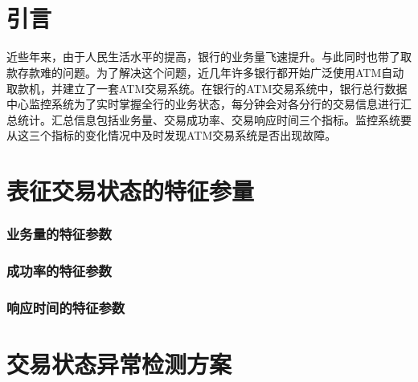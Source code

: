 \documentclass[a4paper]{article}
\begin{document}
\begin{titlepage}



\end{titlepage}

\begin{Huge}
\end{Huge}
\begin{large}
	\begin{flushright}
		
	\end{flushright}
\end{large}
\ \ \\\\

\begin{abstract}
\textit{}
\end{abstract}

\newpage

\tableofcontents

\newpage

\part{引言}
近些年来，由于人民生活水平的提高，银行的业务量飞速提升。与此同时也带了取款存款难的问题。为了解决这个问题，近几年许多银行都开始广泛使用ATM自动取款机，并建立了一套ATM交易系统。在银行的ATM交易系统中，银行总行数据中心监控系统为了实时掌握全行的业务状态，每分钟会对各分行的交易信息进行汇总统计。汇总信息包括业务量、交易成功率、交易响应时间三个指标。监控系统要从这三个指标的变化情况中及时发现ATM交易系统是否出现故障。

\part{表征交易状态的特征参量}
\section{业务量的特征参数}
\section{成功率的特征参数}
\section{响应时间的特征参数}

\part{交易状态异常检测方案}
\end{document}
